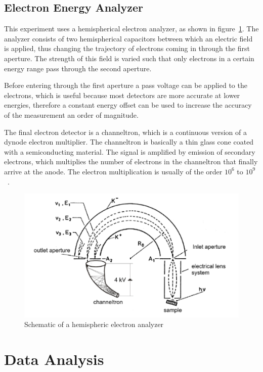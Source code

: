 \documentclass[a4paper,10pt]{scrartcl}
\begin{document}
\subsection{Electron Energy Analyzer}

This experiment uses a hemispherical electron analyzer, as shown in figure~\ref{fig:analyzer}. The analyzer consists of two hemispherical capacitors between which an electric field is applied, thus changing the trajectory of electrons coming in through the first aperture. The strength of this field is varied such that only electrons in a certain energy range pass through the second aperture.

Before entering through the first aperture a pass voltage can be applied to the electrons, which is useful because most detectors are more accurate at lower energies, therefore a constant energy offset can be used to increase the accuracy of the measurement an order of magnitude.

The final electron detector is a channeltron, which is a  continuous version of a dynode electron multiplier. The channeltron is basically a thin glass cone coated with a semiconducting material. The signal is amplified by emission of secondary electrons, which multiplies the number of electrons in the channeltron that finally arrive at the anode. The electron multiplication is usually of the order $10^6$ to $10^9$~\cite{book}.

\begin{figure}
\centering
\includegraphics[scale=0.4]{img/analyzer}
\caption{Schematic of a hemispheric electron analyzer \label{fig:analyzer}}
\end{figure}

\section{Data Analysis}
\end{document}
